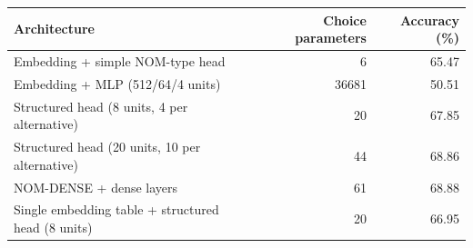 \begin{tabular}{p{8.8cm}rr}
\toprule
Architecture & Choice parameters & Accuracy (\%) \\
\midrule
Embedding + simple NOM-type head & 6 & 65.47 \\
Embedding + MLP (512/64/4 units) & 36681 & 50.51 \\
Structured head (8 units, 4 per alternative) & 20 & 67.85 \\
Structured head (20 units, 10 per alternative) & 44 & 68.86 \\
NOM-DENSE + dense layers & 61 & 68.88 \\
Single embedding table + structured head (8 units) & 20 & 66.95 \\
\bottomrule
\end{tabular}
